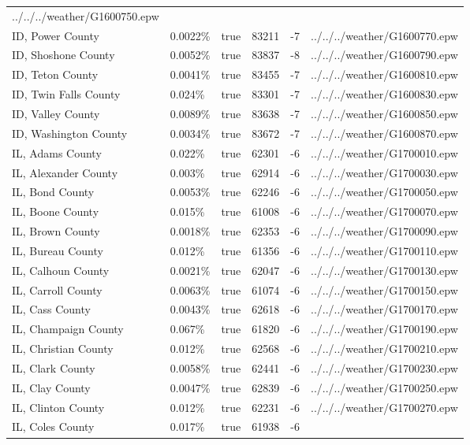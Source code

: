 \begin{longtable}[]{@{}llllll@{}}
../../../weather/G1600750.epw \\
ID, Power County & 0.0022\% & true & 83211 & -7 &
../../../weather/G1600770.epw \\
ID, Shoshone County & 0.0052\% & true & 83837 & -8 &
../../../weather/G1600790.epw \\
ID, Teton County & 0.0041\% & true & 83455 & -7 &
../../../weather/G1600810.epw \\
ID, Twin Falls County & 0.024\% & true & 83301 & -7 &
../../../weather/G1600830.epw \\
ID, Valley County & 0.0089\% & true & 83638 & -7 &
../../../weather/G1600850.epw \\
ID, Washington County & 0.0034\% & true & 83672 & -7 &
../../../weather/G1600870.epw \\
IL, Adams County & 0.022\% & true & 62301 & -6 &
../../../weather/G1700010.epw \\
IL, Alexander County & 0.003\% & true & 62914 & -6 &
../../../weather/G1700030.epw \\
IL, Bond County & 0.0053\% & true & 62246 & -6 &
../../../weather/G1700050.epw \\
IL, Boone County & 0.015\% & true & 61008 & -6 &
../../../weather/G1700070.epw \\
IL, Brown County & 0.0018\% & true & 62353 & -6 &
../../../weather/G1700090.epw \\
IL, Bureau County & 0.012\% & true & 61356 & -6 &
../../../weather/G1700110.epw \\
IL, Calhoun County & 0.0021\% & true & 62047 & -6 &
../../../weather/G1700130.epw \\
IL, Carroll County & 0.0063\% & true & 61074 & -6 &
../../../weather/G1700150.epw \\
IL, Cass County & 0.0043\% & true & 62618 & -6 &
../../../weather/G1700170.epw \\
IL, Champaign County & 0.067\% & true & 61820 & -6 &
../../../weather/G1700190.epw \\
IL, Christian County & 0.012\% & true & 62568 & -6 &
../../../weather/G1700210.epw \\
IL, Clark County & 0.0058\% & true & 62441 & -6 &
../../../weather/G1700230.epw \\
IL, Clay County & 0.0047\% & true & 62839 & -6 &
../../../weather/G1700250.epw \\
IL, Clinton County & 0.012\% & true & 62231 & -6 &
../../../weather/G1700270.epw \\
IL, Coles County & 0.017\% & true & 61938 & -6 &

\end{longtable}
